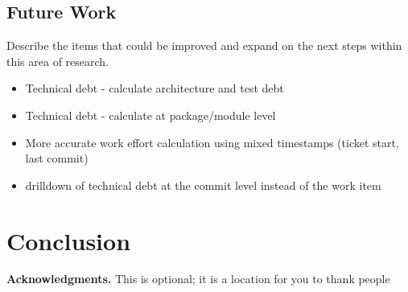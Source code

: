 \documentclass{mpaper}
\begin{document}
\subsection{Future Work}
\label{future-work}

Describe the items that could be improved and expand on the next steps within
this area of research.

\begin{itemize}
  \item Technical debt - calculate architecture and test debt
  \item Technical debt - calculate at package/module level
  \item More accurate work effort calculation using mixed timestamps (ticket start, last commit)
  \item drilldown of technical debt at the commit level instead of the work item
\end{itemize}

\section{Conclusion}
\label{conclusion}

{\bf Acknowledgments.} This is optional; it is a location for you to thank
people



\end{document}
